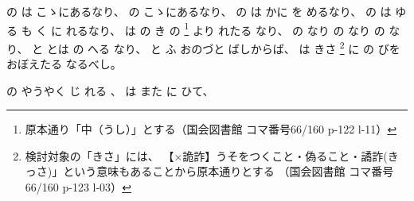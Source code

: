 の
は
こゝにあるなり、%
%
の
こゝにあるなり、%
%
の
%
は
かに
を
めるなり、%
%
の
は
ゆる
も
く
に
れるなり、
%
は
の
き%
の
\footnote{原本通り「中（うし）」とする（国会図書館 コマ番号66/160 p-122 l-11）}%
より
れたる
なり、
%
の
なり
の
なり
の
なり、
%
と
とは
の
へる
なり、
%
と
ふ
おのづと
ばしからば、
%
は
きさ%
\footnote{%
検討対象の「きさ」には、
【×詭詐】うそをつくこと・偽ること・譎詐(きっさ)」という意味もあることから原本通りとする
（国会図書館 コマ番号66/160 p-123 l-03）
}%
に%
の
びを
おぼえたる
なるべし。

%
の
やうやく
じ
れる
、
%
は
また
に
ひて、

